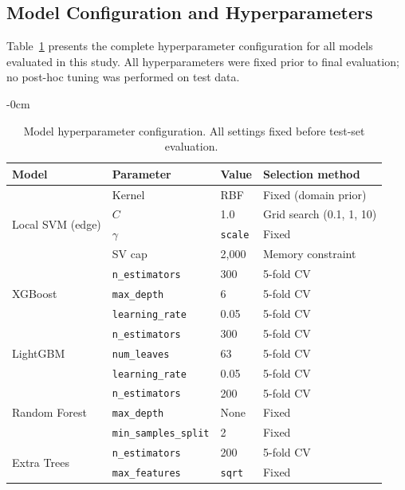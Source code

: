 \documentclass[sensors,article,submit,pdftex,moreauthors]{Definitions/mdpi}
\begin{document}
\subsection{Model Configuration and Hyperparameters}

Table~\ref{tab:hyperparams} presents the complete hyperparameter configuration for all models evaluated in this study. All hyperparameters were fixed prior to final evaluation; no post-hoc tuning was performed on test data.

\begin{table}[H]
\caption{Model hyperparameter configuration. All settings fixed before test-set evaluation.~\label{tab:hyperparams}}
	\begin{adjustwidth}{-\extralength}{0cm}
		\begin{tabularx}{\fulllength}{@{}p{2.8cm}lll@{}}
\toprule
\textbf{Model} & \textbf{Parameter} & \textbf{Value} & \textbf{Selection method} \\
\midrule
\multirow{4}{*}{Local SVM (edge)}
  & Kernel       & RBF                    & Fixed (domain prior) \\
  & $C$          & 1.0                    & Grid search (0.1, 1, 10) \\
  & $\gamma$     & \texttt{scale}         & Fixed \\
  & SV cap       & 2,000                  & Memory constraint \\
\midrule
\multirow{3}{*}{XGBoost}
  & \texttt{n\_estimators}   & 300   & 5-fold CV \\
  & \texttt{max\_depth}      & 6     & 5-fold CV \\
  & \texttt{learning\_rate}  & 0.05  & 5-fold CV \\
\midrule
\multirow{3}{*}{LightGBM}
  & \texttt{n\_estimators}   & 300   & 5-fold CV \\
  & \texttt{num\_leaves}     & 63    & 5-fold CV \\
  & \texttt{learning\_rate}  & 0.05  & 5-fold CV \\
\midrule
\multirow{3}{*}{Random Forest}
  & \texttt{n\_estimators}   & 200   & 5-fold CV \\
  & \texttt{max\_depth}      & None  & Fixed \\
  & \texttt{min\_samples\_split} & 2 & Fixed \\
\midrule
\multirow{2}{*}{Extra Trees}
  & \texttt{n\_estimators}   & 200   & 5-fold CV \\
  & \texttt{max\_features}   & \texttt{sqrt} & Fixed \\

\end{tabularx}
\end{adjustwidth}
\end{table}
\end{document}
